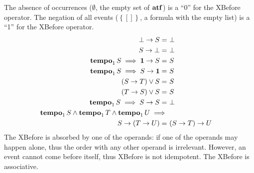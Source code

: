 The absence of occurrences ($\emptyset$, the empty set of $\mathbf{atf}$) is a ``0'' for the \ac{XBefore} operator.
The negation of all events ($\left\{\left[\right]\right\}$, a formula with the empty list) is a ``1'' for the \ac{XBefore} operator.
%
\begin{subequations}
\begin{align}
\xbefore{\bot}{S} =&~
  \bot &
  \label{thm:xbefore-of-false-1}\\
%
\xbefore{S}{\bot} =&~
  \bot &
  \label{thm:xbefore-of-false-2}\\
%
\tempo[1]{S} \implies \xbefore{\neutral}{S} =&~
  S &
  \label{thm:xbefore_neutral_1}\\
%
\tempo[1]{S} \implies \xbefore{S}{\neutral} =&~
  S &
  \label{thm:xbefore_neutral_2}\\
%
\left(\xbefore{S}{T}\right) \lor S =&~ S &
  \label{thm:xbefore-sup-absorb-1}\\
%
\left(\xbefore{T}{S}\right) \lor S =&~ S &
  \label{thm:xbefore-sup-absorb-2}\\
%
\tempo[1]{S} \implies
  \xbefore{S}{S} =&~
  \bot &
  \label{thm:xbefore-not-idempotent}\\
%
\tempo[1]{S}\land\tempo[1]{T}\land \tempo[1]{U}\implies&\nonumber\\
  \xbefore{S}{(\xbefore{T}{U})} =&~
  \xbefore{(\xbefore{S}{T})}{U} &
  \label{thm:xbefore-associativity}
%
\end{align}
\end{subequations}
%
The \ac{XBefore} is absorbed by one of the operands: if one of the operands may happen alone, thus the order with any other operand is irrelevant.
However, an event cannot come before itself, thus \ac{XBefore} is not idempotent.
The \ac{XBefore} is associative.


